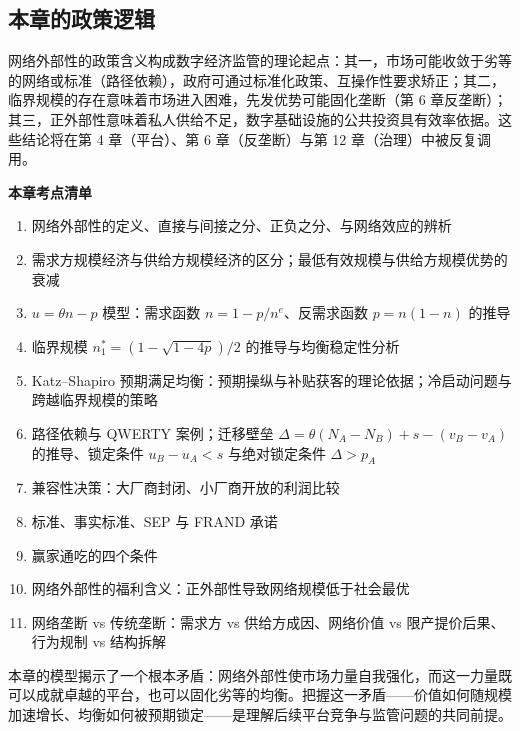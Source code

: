 \subsection{本章的政策逻辑}

网络外部性的政策含义构成数字经济监管的理论起点：其一，市场可能收敛于劣等的网络或标准（路径依赖），政府可通过标准化政策、互操作性要求矫正；其二，临界规模的存在意味着市场进入困难，先发优势可能固化垄断（第 6 章反垄断）；其三，正外部性意味着私人供给不足，数字基础设施的公共投资具有效率依据。这些结论将在第 4 章（平台）、第 6 章（反垄断）与第 12 章（治理）中被反复调用。

\begin{chapterbox}
\textbf{本章考点清单}

\begin{enumerate}
\item 网络外部性的定义、直接与间接之分、正负之分、与网络效应的辨析 
\item 需求方规模经济与供给方规模经济的区分；最低有效规模与供给方规模优势的衰减 
\item $u = \theta n - p$ 模型：需求函数 $n = 1 - p/n^e$、反需求函数 $p = n(1-n)$ 的推导 
\item 临界规模 $n_1^* = (1-\sqrt{1-4p})/2$ 的推导与均衡稳定性分析 
\item Katz–Shapiro 预期满足均衡：预期操纵与补贴获客的理论依据；冷启动问题与跨越临界规模的策略 
\item 路径依赖与 QWERTY 案例；迁移壁垒 $\Delta = \theta(N_A - N_B) + s - (v_B - v_A)$ 的推导、锁定条件 $u_B - u_A < s$ 与绝对锁定条件 $\Delta > p_A$ 
\item 兼容性决策：大厂商封闭、小厂商开放的利润比较 
\item 标准、事实标准、SEP 与 FRAND 承诺 
\item 赢家通吃的四个条件 
\item 网络外部性的福利含义：正外部性导致网络规模低于社会最优 
\item 网络垄断 vs 传统垄断：需求方 vs 供给方成因、网络价值 vs 限产提价后果、行为规制 vs 结构拆解 
\end{enumerate}
\end{chapterbox}

本章的模型揭示了一个根本矛盾：网络外部性使市场力量自我强化，而这一力量既可以成就卓越的平台，也可以固化劣等的均衡。把握这一矛盾——价值如何随规模加速增长、均衡如何被预期锁定——是理解后续平台竞争与监管问题的共同前提。
